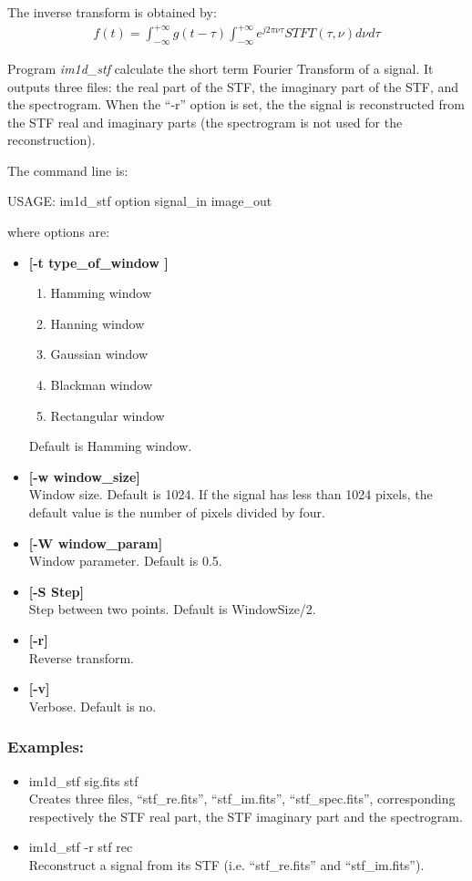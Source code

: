 The inverse transform is obtained by:
\begin{eqnarray}
f(t) =  \int_{-\infty}^{+\infty}  g(t-\tau)  \int_{-\infty}^{+\infty} e^{j2\pi\nu \tau} STFT(\tau, \nu) d\nu d\tau
\end{eqnarray}

\bigskip
Program {\em im1d\_stf} calculate the short term Fourier Transform of a signal.
It outputs three files: the real part of the STF,  the imaginary part
of the STF, and the spectrogram. When the ``-r'' option is set, the 
the signal is reconstructed from the STF real and imaginary parts  
(the spectrogram is not used for the reconstruction).
 
\smallskip
The command line is:
{\bf
\begin{center}
 USAGE: im1d\_stf option signal\_in image\_out
\end{center}}
where options are:
\begin{itemize}
\baselineskip=0.4truecm
\item {\bf [-t type\_of\_window ]}
\begin{enumerate}
\itemsep=0.1truecm
\baselineskip=0.4truecm
\item Hamming window
\item Hanning window
\item Gaussian window
\item Blackman window
\item Rectangular window
\end{enumerate}
Default is Hamming window.
\item {\bf [-w window\_size]} \\
Window size. Default is 1024. 
If the signal has less than 1024 pixels, the default value is
the number of pixels divided by four.
\item {\bf [-W window\_param]} \\
 Window parameter. Default is 0.5.
\item {\bf [-S Step]} \\
 Step between two points. Default is WindowSize/2. 
\item {\bf [-r]} \\
 Reverse transform.
\item {\bf [-v]} \\
Verbose. Default is no.
\end{itemize}

\subsubsection*{Examples:}
\begin{itemize}
\item im1d\_stf sig.fits stf \\
Creates three files, ``stf\_re.fits'', ``stf\_im.fits'',  ``stf\_spec.fits'',
corresponding respectively the STF real part, the STF imaginary part and
the spectrogram.
\item  im1d\_stf -r stf rec \\
Reconstruct a signal from its STF (i.e. ``stf\_re.fits'' and ``stf\_im.fits'').
\end{itemize}


